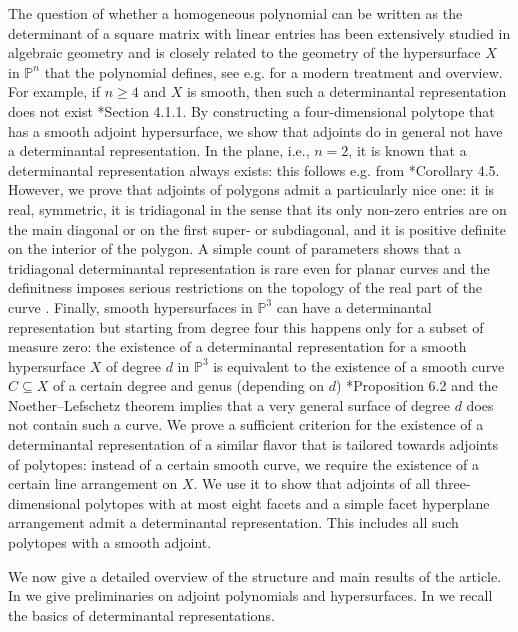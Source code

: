 \documentclass[a4paper,10pt]{amsart}
\theoremstyle{definition}
\theoremstyle{plain}
\newcommand{\pp}{\mathbb{P}}
\begin{document}
The question of whether a homogeneous polynomial can be written as the determinant of a square matrix with linear entries has been extensively studied in algebraic geometry and is closely related to the geometry of the hypersurface $X$ in $\pp^n$ that the polynomial defines, see e.g. \cite{Beauville2000DetHypSurf} for a modern treatment and overview. For example, if $n\geq4$ and $X$ is smooth, then such a determinantal representation does not exist \cite{Dolgachev2012CAG}*{Section 4.1.1}. By constructing a four-dimensional polytope that has a smooth adjoint hypersurface, we show that adjoints do in general not have a determinantal representation. In the plane, i.e., $n=2$, it is known that a determinantal representation always exists: this follows e.g. from \cite{EisenbudSchreyerWeyman2003UlrichBundles}*{Corollary 4.5}. However, we prove that adjoints of polygons admit a particularly nice one: it is real, symmetric, it is tridiagonal in the sense that its only non-zero entries are on the main diagonal or on the first super- or subdiagonal, and it is positive definite on the interior of the polygon. A simple count of parameters shows that a tridiagonal determinantal representation is rare even for planar curves and the definitness imposes serious restrictions on the topology of the real part of the curve \cite{heltonvinnikov}. Finally, smooth hypersurfaces in $\pp^3$ can have a determinantal representation but starting from degree four this happens only for a subset of measure zero: the existence of a determinantal representation for a smooth hypersurface $X$ of degree $d$ in $\pp^3$ is equivalent to the existence of a smooth curve $C\subseteq X$ of a certain degree and genus (depending on $d$) \cite{Beauville2000DetHypSurf}*{Proposition 6.2} and the Noether--Lefschetz theorem \cite{noetherlefschetz} implies that a very general surface of degree $d$ does not contain such a curve. We prove a sufficient criterion for the existence of a determinantal representation of a similar flavor that is tailored towards adjoints of polytopes: instead of a certain smooth curve, we require the existence of a certain line arrangement on $X$. We use it to show that adjoints of all three-dimensional polytopes with at most eight facets and a simple facet hyperplane arrangement admit a determinantal representation. This includes all such polytopes with a smooth adjoint.

We now give a detailed overview of the structure and main results of the article. In  we give preliminaries on adjoint polynomials and hypersurfaces. In  we recall the basics of determinantal representations.
\end{document}
